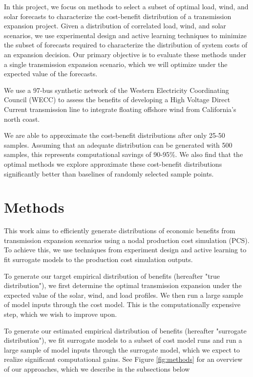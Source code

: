 \documentclass[10pt,twocolumn,letterpaper]{article}
\begin{document}
In this project, we focus on methods to select a subset of optimal load, wind, and solar forecasts to characterize the cost-benefit distribution of a transmission expansion project. Given a distribution of correlated load, wind, and solar scenarios, we use experimental design and active learning techniques to minimize the subset of forecasts required to characterize the distribution of system costs of an expansion decision. Our primary objective is to evaluate these methods under a single transmission expansion scenario, which we will optimize under the expected value of the forecasts. 

We use a 97-bus synthetic network of the Western Electricity Coordinating Council (WECC) to assess the benefits of developing a High Voltage Direct Current transmission line to integrate floating offshore wind from California's north coast.

We are able to approximate the cost-benefit distributions after only 25-50 samples. Assuming that an adequate distribution can be generated with 500 samples, this represents computational savings of 90-95\%. We also find that the optimal methods we explore approximate these cost-benefit distributions significantly better than baselines of randomly selected sample points.

\section{Methods}
\label{sec:methods}
This work aims to efficiently generate distributions of economic benefits from transmission expansion scenarios using a nodal production cost simulation (PCS). To achieve this, we use techniques from experiment design and active learning to fit surrogate models to the production cost simulation outputs.

To generate our target empirical distribution of benefits (hereafter "true distribution"), we first determine the optimal transmission expansion under the expected value of the solar, wind, and load profiles. We then run a large sample of model inputs through the cost model. This is the computationally expensive step, which we wish to improve upon. 

To generate our estimated empirical distribution of benefits (hereafter "surrogate distribution"), we fit surrogate models to a subset of cost model runs and run a large sample of model inputs through the surrogate model, which we expect to realize significant computational gains. See Figure \ref{fig:methods} for an overview of our approaches, which we describe in the subsections below
\end{document}
